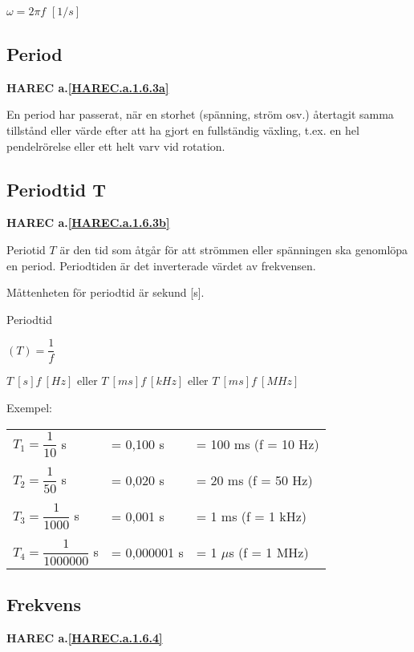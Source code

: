 \(\omega= 2\pi f\) \([1/s]\)

\subsection{Period}
\textbf{HAREC a.\ref{HAREC.a.1.6.3a}\label{myHAREC.a.1.6.3a}}

En period har passerat, när en storhet (spänning, ström osv.) återtagit samma
tillstånd eller värde efter att ha gjort en fullständig växling, t.ex. en hel
pendelrörelse eller ett helt varv vid rotation.

\subsection{Periodtid T}
\textbf{HAREC a.\ref{HAREC.a.1.6.3b}\label{myHAREC.a.1.6.3b}}

Periotid \(T\) är den tid som åtgår för att strömmen eller spänningen ska
genomlöpa en period. Periodtiden är det inverterade värdet av frekvensen.

Måttenheten för periodtid är sekund [s].

Periodtid

\((T) = \dfrac{1}{f}\)

\(T\ [s]  f\ [Hz]\) eller
\(T\ [ms] f\ [kHz]\) eller
\(T\ [ms] f\ [MHz]\)

Exempel:

\begin{center}
\begin{tabular}{lll}
\(T_1=\dfrac{1}{10}\) s & = 0,100 s & = 100 ms (f = 10 Hz)\\
\\
\(T_2=\dfrac{1}{50}\) s & = 0,020 s & = 20 ms (f = 50 Hz)\\
\\
\(T_3=\dfrac{1}{1000}\) s & = 0,001 s & = 1 ms (f = 1 kHz)\\
\\
\(T_4=\dfrac{1}{1000000}\) s & = 0,000001 s & = 1 \(\mu\)s (f = 1 MHz)\\
\end{tabular}
\end{center}

\subsection{Frekvens}
\textbf{HAREC a.\ref{HAREC.a.1.6.4}\label{myHAREC.a.1.6.4}}


